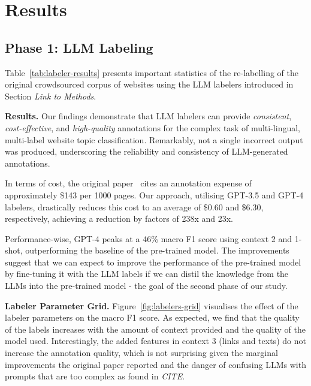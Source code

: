 \section{Results}

\subsection{Phase 1: LLM Labeling}



Table~\ref{tab:labeler-results} presents important statistics of the re-labelling of the original crowdsourced corpus of websites using the LLM labelers introduced in Section \textit{Link to Methods}.

\textbf{Results.} Our findings demonstrate that LLM labelers can provide \textit{consistent}, \textit{cost-effective}, and \textit{high-quality} annotations for the complex task of multi-lingual, multi-label website topic classification. Remarkably, not a single incorrect output was produced, underscoring the reliability and consistency of LLM-generated annotations.

In terms of cost, the original paper~\cite{homepage2vec} cites an annotation expense of approximately \$143 per 1000 pages. Our approach, utilising GPT-3.5 and GPT-4 labelers, drastically reduces this cost to an average of \$0.60 and \$6.30, respectively, achieving a reduction by factors of 238x and 23x.

Performance-wise, GPT-4 peaks at a 46\% macro F1 score using context 2 and 1-shot, outperforming the baseline of the pre-trained model. The improvements suggest that we can expect to improve the performance of the pre-trained model by fine-tuning it with the LLM labels if we can distil the knowledge from the LLMs into the pre-trained model - the goal of the second phase of our study.

\textbf{Labeler Parameter Grid.} Figure~\ref{fig:labelers-grid} visualises the effect of the labeler parameters on the macro F1 score. As expected, we find that the quality of the labels increases with the amount of context provided and the quality of the model used. Interestingly, the added features in context 3 (links and texts) do not increase the annotation quality, which is not surprising given the marginal improvements the original paper reported and the danger of confusing LLMs with prompts that are too complex as found in \textit{CITE}.

